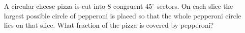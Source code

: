 A circular cheese pizza is cut into $8$ congruent $45^\circ$ sectors. On each slice the largest possible circle of pepperoni is placed so that the whole pepperoni circle lies on that slice. What fraction of the pizza is covered by pepperoni?
